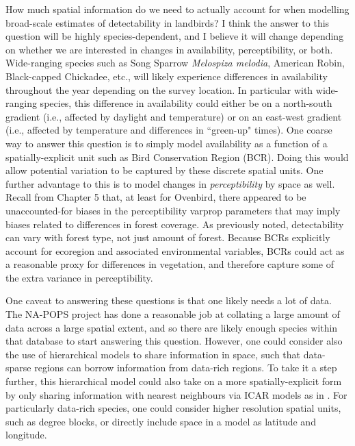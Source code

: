 \par How much spatial information do we need to actually account for when modelling broad-scale estimates of detectability in landbirds?
I think the answer to this question will be highly species-dependent, and I believe it will change depending on whether we are interested in changes in availability, perceptibility, or both.
Wide-ranging species such as Song Sparrow \textit{Melospiza melodia}, American Robin, Black-capped Chickadee, etc., will likely experience differences in availability throughout the year depending on the survey location.
In particular with wide-ranging species, this difference in availability could either be on a north-south gradient (i.e., affected by daylight and temperature) or on an east-west gradient (i.e., affected by temperature and differences in ``green-up" times).
One coarse way to answer this question is to simply model availability as a function of a spatially-explicit unit such as Bird Conservation Region (BCR).
Doing this would allow potential variation to be captured by these discrete spatial units.
One further advantage to this is to model changes in \textit{perceptibility} by space as well.
Recall from Chapter 5 that, at least for Ovenbird, there appeared to be unaccounted-for biases in the perceptibility varprop parameters that may imply biases related to differences in forest coverage.
As previously noted, detectability can vary with forest type, not just amount of forest.
Because BCRs explicitly account for ecoregion and associated environmental variables, BCRs could act as a reasonable proxy for differences in vegetation, and therefore capture some of the extra variance in perceptibility.

\par One caveat to answering these questions is that one likely needs a lot of data.
The NA-POPS project has done a reasonable job at collating a large amount of data across a large spatial extent, and so there are likely enough species within that database to start answering this question.
However, one could consider also the use of hierarchical models to share information in space, such that data-sparse regions can borrow information from data-rich regions.
To take it a step further, this hierarchical model could also take on a more spatially-explicit form by only sharing information with nearest neighbours via ICAR models as in \citet{smith_spatially_2023}.
For particularly data-rich species, one could consider higher resolution spatial units, such as degree blocks, or directly include space in a model as latitude and longitude.


